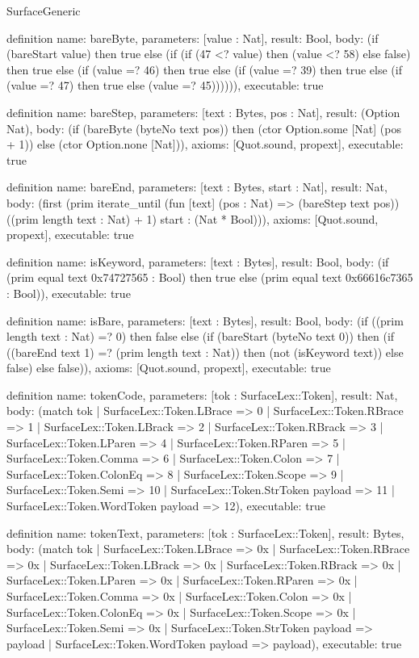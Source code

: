 \begin{lexlean}{SurfaceGeneric}
\begin{semanticmodule}
definition{
  name: bareByte,
  parameters: [value : Nat],
  result: Bool,
  body: (if (bareStart value) then true else (if (if (47 <? value) then (value <? 58) else false) then true else (if (value =? 46) then true else (if (value =? 39) then true else (if (value =? 47) then true else (value =? 45)))))),
  executable: true
}

definition{
  name: bareStep,
  parameters: [text : Bytes, pos : Nat],
  result: (Option Nat),
  body: (if (bareByte (byteNo text pos)) then (ctor Option.some [Nat] (pos + 1)) else (ctor Option.none [Nat])),
  axioms: [Quot.sound, propext],
  executable: true
}

definition{
  name: bareEnd,
  parameters: [text : Bytes, start : Nat],
  result: Nat,
  body: (first (prim iterate_until (fun [text] (pos : Nat) => (bareStep text pos)) ((prim length text : Nat) + 1) start : (Nat * Bool))),
  axioms: [Quot.sound, propext],
  executable: true
}

definition{
  name: isKeyword,
  parameters: [text : Bytes],
  result: Bool,
  body: (if (prim equal text 0x74727565 : Bool) then true else (prim equal text 0x66616c7365 : Bool)),
  executable: true
}

definition{
  name: isBare,
  parameters: [text : Bytes],
  result: Bool,
  body: (if ((prim length text : Nat) =? 0) then false else (if (bareStart (byteNo text 0)) then (if ((bareEnd text 1) =? (prim length text : Nat)) then (not (isKeyword text)) else false) else false)),
  axioms: [Quot.sound, propext],
  executable: true
}

definition{
  name: tokenCode,
  parameters: [tok : SurfaceLex::Token],
  result: Nat,
  body: (match tok
    | SurfaceLex::Token.LBrace => 0
    | SurfaceLex::Token.RBrace => 1
    | SurfaceLex::Token.LBrack => 2
    | SurfaceLex::Token.RBrack => 3
    | SurfaceLex::Token.LParen => 4
    | SurfaceLex::Token.RParen => 5
    | SurfaceLex::Token.Comma => 6
    | SurfaceLex::Token.Colon => 7
    | SurfaceLex::Token.ColonEq => 8
    | SurfaceLex::Token.Scope => 9
    | SurfaceLex::Token.Semi => 10
    | SurfaceLex::Token.StrToken payload => 11
    | SurfaceLex::Token.WordToken payload => 12),
  executable: true
}

definition{
  name: tokenText,
  parameters: [tok : SurfaceLex::Token],
  result: Bytes,
  body: (match tok
    | SurfaceLex::Token.LBrace => 0x
    | SurfaceLex::Token.RBrace => 0x
    | SurfaceLex::Token.LBrack => 0x
    | SurfaceLex::Token.RBrack => 0x
    | SurfaceLex::Token.LParen => 0x
    | SurfaceLex::Token.RParen => 0x
    | SurfaceLex::Token.Comma => 0x
    | SurfaceLex::Token.Colon => 0x
    | SurfaceLex::Token.ColonEq => 0x
    | SurfaceLex::Token.Scope => 0x
    | SurfaceLex::Token.Semi => 0x
    | SurfaceLex::Token.StrToken payload => payload
    | SurfaceLex::Token.WordToken payload => payload),
  executable: true
}


\end{semanticmodule}
\end{lexlean}
